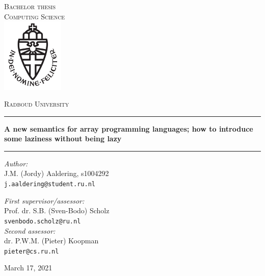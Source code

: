 \documentclass[11pt,a4paper]{report}
\begin{document}
\begin{titlepage}
\begin{center}
\textsc{\LARGE Bachelor thesis \\ Computing Science} \\[1.5cm]
\includegraphics[height=100pt]{logo}

\vspace{0.4cm}
\textsc{\Large Radboud University} \\[1cm]
\hrule
\vspace{0.4cm}
\textbf{\huge A new semantics for array programming languages; how to introduce some laziness without being lazy} \\[0.8cm]
\hrule
%
\vspace{2cm}
\begin{minipage}[t]{0.45\textwidth}
\begin{flushleft} \large
\textit{Author:} \\
    J.M. (Jordy) Aaldering, %
    s1004292 \\
    \texttt{j.aaldering@student.ru.nl}
\end{flushleft}
\end{minipage}
%
\begin{minipage}[t]{0.45\textwidth}
\begin{flushright} \large
\textit{First supervisor/assessor:} \\
    Prof. dr. S.B. (Sven-Bodo) Scholz \\
    \texttt{svenbodo.scholz@ru.nl}\\[1.3cm]
\textit{Second assessor:} \\
    dr. P.W.M. (Pieter) Koopman \\
    \texttt{pieter@cs.ru.nl}
\end{flushright}
\end{minipage}
%
\vfill
{\large March 17, 2021}
\end{center}
\end{titlepage}



\end{document}
